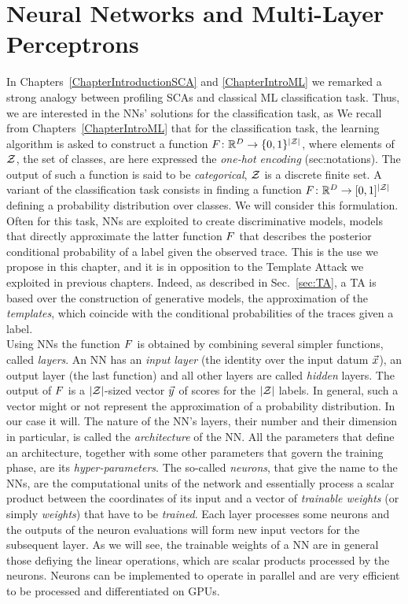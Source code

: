 \section{Neural Networks and Multi-Layer Perceptrons}\label{sec:MLP}
In Chapters~\ref{ChapterIntroductionSCA} and \ref{ChapterIntroML} we remarked a strong analogy between profiling SCAs and classical ML classification task. Thus, we are interested in the NNs' solutions for the classification task, as  We recall from Chapters~\ref{ChapterIntroML} that for the classification task, the learning algorithm is asked to construct a function $F\colon \mathbb{R}^D \rightarrow \{0,1\}^{\lvert\mathcal{Z}\rvert}$, where elements of $\mathcal{Z}$, \ie the set of classes, are here expressed \via the \emph{one-hot encoding} (sec:notations). The output of such a function is said to be \emph{categorical}, \ie $\mathcal{Z}$ is a discrete finite set. A variant of the classification task consists in finding a function $F\colon \mathbb{R}^D \rightarrow [0,1]^{\lvert\mathcal{Z}\rvert}$ defining a probability distribution over classes. We will consider this formulation. Often for this task, NNs are exploited to create discriminative models, \ie models that directly approximate the latter function $F$ that describes the posterior conditional probability of a label given the observed trace. This is the use we propose in this chapter, and it is in opposition to the Template Attack we exploited in previous chapters. Indeed, as described in Sec.~\ref{sec:TA}, a TA is based over the construction of generative models, \ie the approximation of the \emph{templates}, which coincide with the conditional probabilities of the traces given a label. \\

Using NNs the function $F$ is obtained by combining several simpler functions, called \emph{layers}. An NN has an \emph{input layer} (the identity over the input datum $\vec{x}$), an output layer (the last function) and all other layers are called \emph{hidden} layers.  The output of $F$ is a $\lvert\mathcal{Z}\rvert$-sized vector $\vec{y}$ of scores for the $\lvert\mathcal{Z}\rvert$ labels. In general, such a vector might or not represent the approximation of a probability distribution. In our case it will. The nature of the NN's  layers, their number and their dimension in particular, is called the \emph{architecture} of the NN. All the parameters that define an architecture, together with some other parameters that govern the training phase, are its \emph{hyper-parameters}. The so-called \emph{neurons}, that give the name to the NNs, are the computational units of the network and essentially process a scalar product between the coordinates of its input and a vector of  \emph{trainable weights} (or simply \emph{weights}) that have to be \emph{trained}. Each layer processes some neurons and the outputs of the neuron evaluations will form new input vectors for the subsequent layer. As we will see, the trainable weights of a NN are in general those defiying the linear operations, which are scalar products processed by the neurons. Neurons can be implemented to operate in parallel and are very efficient to be processed and differentiated on GPUs. \\


